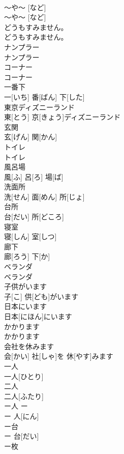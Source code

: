 \documentclass[8pt]{extreport}
\begin{document}
\begin{CJK}{UTF8}{min}
\\	～や～ [など]	
\\	～や～ [など]		
\\	どうもすみません。	
\\	どうもすみません。		
\\	ナンプラー	
\\	ナンプラー		
\\	コーナー	
\\	コーナー		
\\	一番下	
\\	一[いち] 番[ばん] 下[した]		
\\	東京ディズニーランド	
\\	東[とう] 京[きょう]ディズニーランド		
\\	玄関	
\\	玄[げん] 関[かん]		
\\	トイレ	
\\	トイレ		
\\	風呂場	
\\	風[ふ] 呂[ろ] 場[ば]		
\\	洗面所	
\\	洗[せん] 面[めん] 所[じょ]		
\\	台所	
\\	台[だい] 所[どころ]		
\\	寝室	
\\	寝[しん] 室[しつ]		
\\	廊下	
\\	廊[ろう] 下[か]		
\\	ベランダ	
\\	ベランダ		
\\	子供がいます	
\\	子[こ] 供[ども]がいます		
\\	日本にいます	
\\	日本[にほん]にいます		
\\	かかります	
\\	かかります		
\\	会社を休みます	
\\	会[かい] 社[しゃ]を 休[やす]みます		
\\	一人	
\\	一人[ひとり]		
\\	二人	
\\	二人[ふたり]		
\\	ー人	ー 
\\	ー 人[にん]		
\\	ー台	
\\	ー 台[だい]		
\\	ー枚	

\end{CJK}
\end{document}
